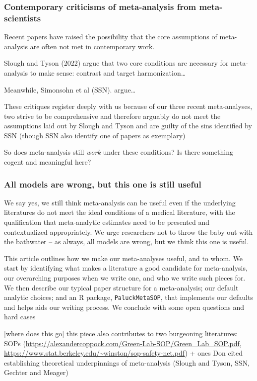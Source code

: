 \documentclass[
  man]{apa6}
\begin{document}
\subsubsection{Contemporary criticisms of meta-analysis from meta-scientists}\label{contemporary-criticisms-of-meta-analysis-from-meta-scientists}

Recent papers have raised the possibility that the core assumptions of meta-analysis are often not met in contemporary work.

Slough and Tyson (2022) argue that two core conditions are necessary for meta-analysis to make sense: contrast and target harmonization\ldots{}

Meanwhile, Simonsohn et al (SSN). argue\ldots{}

These critiques register deeply with us because of our three recent meta-analyses, two strive to be comprehensive and therefore arguably do not meet the assumptions laid out by Slough and Tyson and are guilty of the sins identified by SSN (though SSN also identify one of papers as exemplary)

So does meta-analysis still \emph{work} under these conditions? Is there something cogent and meaningful here?

\subsubsection{All models are wrong, but this one is still useful}\label{all-models-are-wrong-but-this-one-is-still-useful}

We say yes, we still think meta-analysis can be useful even if the underlying literatures do not meet the ideal conditions of a medical literature, with the qualification that meta-analytic estimates need to be presented and contextualized appropriately. We urge researchers not to throw the baby out with the bathwater -- as always, all models are wrong, but we think this one is useful.

This article outlines how we make our meta-analyses useful, and to whom. We start by identifying what makes a literature a good candidate for meta-analysis, our overarching purposes when we write one, and who we write such pieces for. We then describe our typical paper structure for a meta-analysis; our default analytic choices; and an R package, \texttt{PaluckMetaSOP}, that implements our defaults and helps aids our writing process. We conclude with some open questions and hard cases

{[}where does this go{]} this piece also contributes to two burgeoning literatures:
SOPs (\url{https://alexandercoppock.com/Green-Lab-SOP/Green_Lab_SOP.pdf}, \url{https://www.stat.berkeley.edu/~winston/sop-safety-net.pdf}) + ones Don cited
establishing theoretical underpinnings of meta-analysis (Slough and Tyson, SSN, Gechter and Meager)
\end{document}
